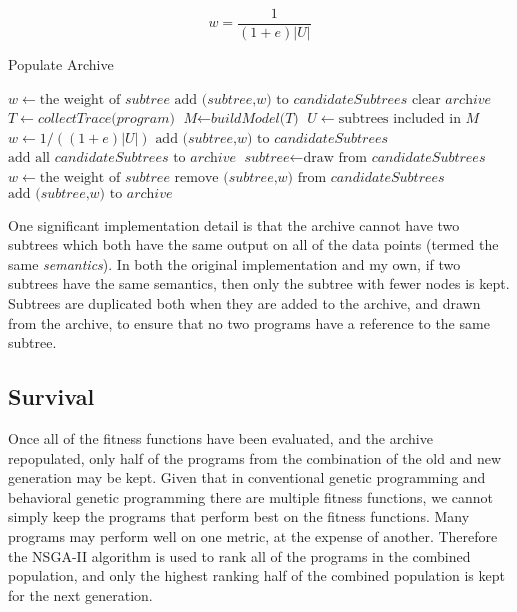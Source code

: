 \begin{equation}
\label{eq:subtree_weight}
w = \frac{1}{(1 + e)|U|}
\end{equation}

\begin{algorithm}
\caption{Populate Archive}\label{pseudocode}
\begin{algorithmic}[1]
\State $w \gets \text{the weight of }\textit{subtree}$
\State $\text{add (}\textit{subtree,w}\text{) to }\textit{candidateSubtrees}$
\EndFor
\State $\text{clear }\textit{archive}$
\State $T \gets \textit{collectTrace(program)}$
\State $\textit{M} \gets \textit{buildModel(T)}$
\State $U \gets \text{subtrees included in } \textit{M}$
\State $w \gets 1/((1 + e)|U|)$
\State $\text{add (}\textit{subtree,w}\text{) to }\textit{candidateSubtrees}$
\EndFor
\EndFor
{}
\State $\text{add all }\textit{candidateSubtrees}\text{ to }\textit{archive}$
\Else
{}
\State $\textit{subtree} \gets \text{draw from }\textit{candidateSubtrees}$
\State $w \gets \text{the weight of }\textit{subtree}$
\State $\text{remove (}\textit{subtree,w}\text{) from }\textit{candidateSubtrees}$
\State $\text{add (}\textit{subtree,w}\text{) to }\textit{archive}$
\EndWhile
\EndIf
\EndProcedure
\end{algorithmic}
\end{algorithm}

One significant implementation detail is that the archive cannot have two subtrees which both have the same output on all of the data points (termed the same \textit{semantics}).  In both the original implementation and my own, if two subtrees have the same semantics, then only the subtree with fewer nodes is kept.  Subtrees are duplicated both when they are added to the archive, and drawn from the archive, to ensure that no two programs have a reference to the same subtree.

\subsection{Survival}
\label{section:survival}
Once all of the fitness functions have been evaluated, and the archive repopulated, only half of the programs from the combination of the old and new generation may be kept.  Given that in conventional genetic programming and behavioral genetic programming there are multiple fitness functions, we cannot simply keep the programs that perform best on the fitness functions.  Many programs may perform well on one metric, at the expense of another.  Therefore the NSGA-II algorithm \cite{nsga} is used to rank all of the programs in the combined population, and only the highest ranking half of the combined population is kept for the next generation.

